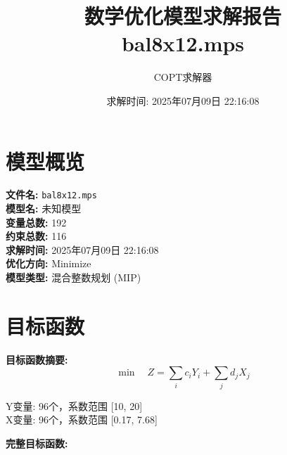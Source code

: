 \documentclass[a4paper,10pt]{article}
\title{数学优化模型求解报告\\{\large bal8x12.mps}}
\author{COPT求解器}
\date{求解时间: 2025年07月09日 22:16:08}
\begin{document}
\maketitle
\tableofcontents
\newpage

\section{模型概览}

\textbf{文件名:} \texttt{bal8x12.mps} \\
\textbf{模型名:} 未知模型 \\
\textbf{变量总数:} 192 \\
\textbf{约束总数:} 116 \\
\textbf{求解时间:} 2025年07月09日 22:16:08 \\
\textbf{优化方向:} Minimize \\

\textbf{模型类型:} 混合整数规划 (MIP)

\section{目标函数}

\textbf{目标函数摘要:}
\begin{equation}
\min \quad Z = \sum_{i} c_i Y_i + \sum_{j} d_j X_j
\end{equation}

Y变量: 96个，系数范围 [10, 20] \\
X变量: 96个，系数范围 [0.17, 7.68]

\textbf{完整目标函数:}
\end{document}
